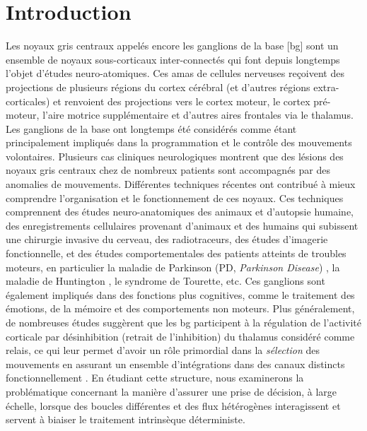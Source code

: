 \DontNumberThisInToc
\DontFrameThisInToc
\glsresetall
{}
\section{Introduction}

Les noyaux gris centraux appelés encore les ganglions de la base [\gls{bg}] sont un ensemble de noyaux sous-corticaux inter-connectés qui font depuis longtemps l'objet d'études neuro-atomiques. Ces amas de cellules nerveuses reçoivent des projections de plusieurs régions du cortex cérébral (et d'autres régions extra-corticales) et renvoient des projections vers le cortex moteur, le cortex pré-moteur, l'aire motrice supplémentaire et d'autres aires frontales via le thalamus. Les ganglions de la base ont longtemps été considérés comme étant principalement impliqués dans la programmation et le contrôle des mouvements volontaires. Plusieurs cas cliniques neurologiques montrent que des lésions des noyaux gris centraux chez de nombreux patients sont accompagnés par des anomalies de mouvements. Différentes techniques récentes ont contribué à mieux comprendre l'organisation et le fonctionnement de ces noyaux. Ces techniques comprennent des études neuro-anatomiques des animaux et d'autopsie humaine, des enregistrements cellulaires provenant d'animaux et des humains qui subissent une chirurgie invasive du cerveau, des radiotraceurs, des études d'imagerie fonctionnelle, et des études comportementales des patients atteints de troubles moteurs, en particulier la maladie de Parkinson (PD, \textit{Parkinson Disease}) \cite{Ehringer:1960}, la maladie de Huntington \cite{Reiner:1988, Sapp:1995}, le syndrome de Tourette, etc. Ces ganglions sont également impliqués dans des fonctions plus cognitives, comme le traitement des émotions, de la mémoire et des comportements non moteurs. Plus généralement, de nombreuses études suggèrent que les \gls{bg} participent à la régulation de l'activité corticale par désinhibition (retrait de l'inhibition) du thalamus considéré comme relais, ce qui leur permet d'avoir un rôle primordial dans la \textit{sélection} des mouvements en assurant un ensemble d'intégrations dans des canaux distincts fonctionnellement \cite{Haber:2003}. En étudiant cette structure, nous examinerons la problématique concernant la manière d'assurer une prise de décision, à large échelle, lorsque des boucles différentes et des flux hétérogènes interagissent et servent à biaiser le traitement intrinsèque déterministe.\\

